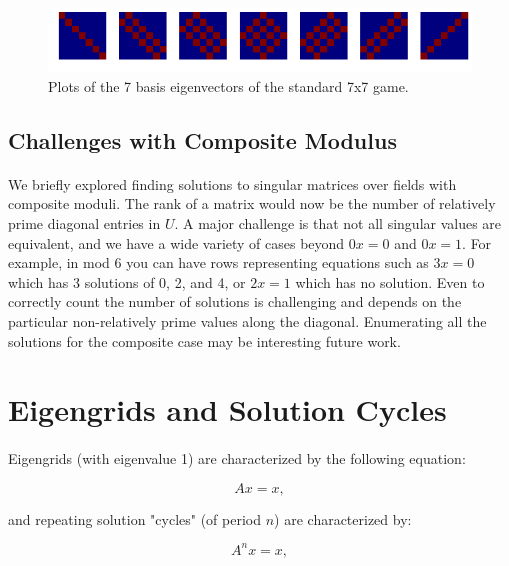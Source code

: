 \documentclass[11pt]{article}
\begin{document}
\begin{figure}
\caption{Plots of the 7 basis eigenvectors of the standard 7x7 game.}
\label{eigbasis77}
\includegraphics[width=\textwidth]{eigbasis77.png}
\end{figure}


\subsection*{Challenges with Composite Modulus}

\paragraph{} We briefly explored finding solutions to singular matrices over fields with composite moduli.  The rank of a matrix would now be the number of relatively prime diagonal entries in $U$.  A major challenge is that not all singular values are equivalent, and we have a wide variety of cases beyond $0x = 0$ and $0x =1$.  For example, in mod 6 you can have rows representing equations such as $3x = 0$ which has 3 solutions of 0, 2, and 4, or $2x = 1$ which has no solution.  Even to correctly count the number of solutions is challenging and depends on the particular non-relatively prime values along the diagonal.  Enumerating all the solutions for the composite case may be interesting future work.

\section*{Eigengrids and Solution Cycles}

\paragraph{} Eigengrids (with eigenvalue 1) are characterized by the following equation:

\begin{equation}
Ax = x,
\end{equation}

\noindent and repeating solution "cycles" (of period $n$) are characterized by:

\begin{equation}
A^nx = x,
\end{equation}
\end{document}
